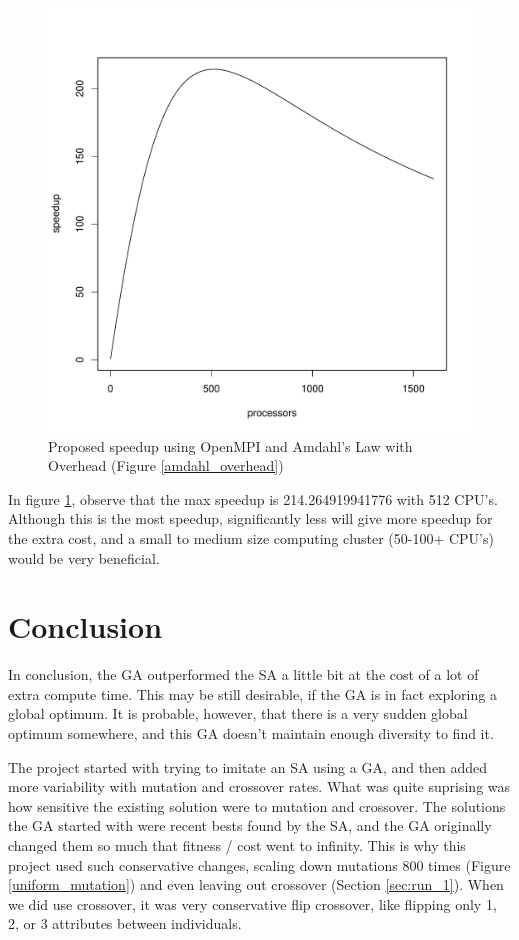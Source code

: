 \begin{figure}[!h]
	\begin{center}
		\includegraphics[width=120mm]{images/amdahl_graph.pdf}
               	\caption{Proposed speedup using OpenMPI and Amdahl's Law with Overhead (Figure \ref{amdahl_overhead}) }
                \label{speedup}
        \end{center}
\end{figure}

In figure \ref{speedup}, observe that the max speedup is 214.264919941776 with 
512 CPU's. Although this is the most speedup, significantly less will give more 
speedup for the extra cost, and a small to medium size computing cluster 
(50-100+ CPU's) would be very beneficial.

\section{Conclusion}
In conclusion, the GA outperformed the SA a little bit at the cost of a lot
of extra compute time. This may be still desirable, if the GA is in fact
exploring a global optimum. It is probable, however, that there is a very 
sudden global optimum somewhere, and this GA doesn't maintain enough diversity
to find it.

The project started with trying to imitate an SA using a GA, and then added 
more variability with mutation and crossover rates. What was quite suprising
was how sensitive the existing solution were to mutation and crossover.
The solutions the GA started with were recent bests found by the SA, and 
the GA originally changed them so much that fitness / cost went to infinity.
This is why this project used such conservative changes, scaling down 
mutations 800 times (Figure \ref{uniform_mutation}) and even leaving out 
crossover (Section \ref{sec:run_1}). When we did use crossover, it was very
conservative flip crossover, like flipping only 1, 2, or 3 attributes 
between individuals.

